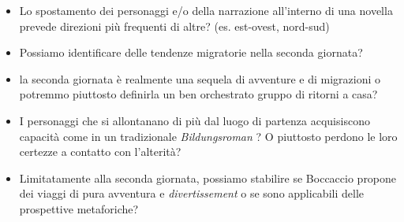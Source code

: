 \begin{itemize}
\tightlist
\item
  Lo spostamento dei personaggi e/o della narrazione all'interno di una
  novella prevede direzioni più frequenti di altre? (es. est-ovest,
  nord-sud)
\item
  Possiamo identificare delle tendenze migratorie nella seconda
  giornata?
\item
  la seconda giornata è realmente una sequela di avventure e di
  migrazioni o potremmo piuttosto definirla un ben orchestrato gruppo di
  ritorni a casa?
\item
  I personaggi che si allontanano di più dal luogo di partenza
  acquisiscono capacità come in un tradizionale \emph{Bildungsroman} ? O
  piuttosto perdono le loro certezze a contatto con l'alterità?
\item
  Limitatamente alla seconda giornata, possiamo stabilire se Boccaccio
  propone dei viaggi di pura avventura e \emph{divertissement} o se sono
  applicabili delle prospettive metaforiche?
\end{itemize}
